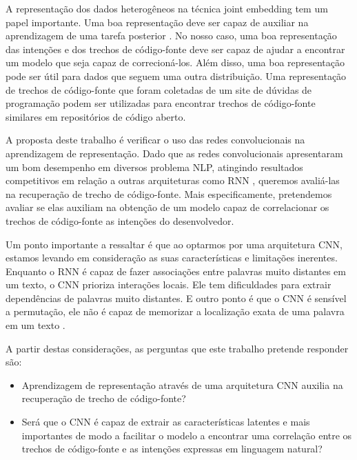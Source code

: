 A representação dos dados heterogêneos na técnica joint embedding tem um papel importante. Uma boa representação deve ser capaz de auxiliar na aprendizagem de uma tarefa
posterior \citep{Goodfellow-et-al-2016:representation-learning}. No nosso caso, uma boa representação das intenções e dos trechos de código-fonte deve ser capaz de ajudar a encontrar um modelo que seja capaz de correcioná-los. Além disso, uma boa representação pode ser útil para dados que seguem uma outra distribuição. Uma representação de trechos de código-fonte que foram coletadas de um site de dúvidas de programação podem ser utilizadas para encontrar trechos de código-fonte similares em repositórios de código aberto.

A proposta deste trabalho é verificar o uso das redes convolucionais na aprendizagem de representação. Dado que as redes convolucionais apresentaram um bom desempenho em diversos problema NLP, atingindo resultados competitivos em relação a outras arquiteturas como RNN \citep{tom-young:trends-deep-learning-nlp}, queremos avaliá-las na recuperação de trecho de código-fonte. Mais especificamente, pretendemos avaliar se elas auxiliam na obtenção de um modelo capaz de correlacionar os trechos de código-fonte as intenções do desenvolvedor. 

Um ponto importante a ressaltar é que ao optarmos por uma arquitetura CNN, estamos levando em consideração as suas características e limitações inerentes. Enquanto o RNN é capaz de fazer associações entre palavras muito distantes em um texto, o CNN prioriza interações locais. Ele tem dificuldades para extrair dependências de palavras muito distantes. E outro ponto é que o CNN é sensível a permutação, ele não é capaz de memorizar a localização exata de uma palavra em um texto \citep{Goodfellow-et-al-2016:convolutional-networks, tom-young:trends-deep-learning-nlp}.

A partir destas considerações, as perguntas que este trabalho pretende responder são:

\begin{itemize}
    \item Aprendizagem de representação através de uma arquitetura CNN auxilia na recuperação de trecho de código-fonte?
    
    \item Será que o CNN é capaz de extrair as características latentes e mais importantes de modo a facilitar o modelo a encontrar uma correlação entre os trechos de código-fonte e as intenções expressas em linguagem natural?
\end{itemize}

